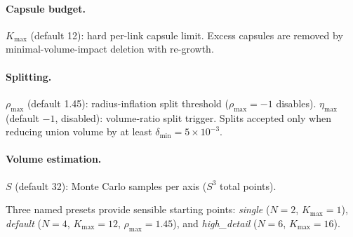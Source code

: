 \paragraph{Capsule budget.}
$K_{\max}$ (default 12): hard per-link capsule limit. Excess capsules are removed by minimal-volume-impact deletion with re-growth.

\paragraph{Splitting.}
$\rho_{\max}$ (default 1.45): radius-inflation split threshold ($\rho_{\max} = -1$ disables). $\eta_{\max}$ (default $-1$, disabled): volume-ratio split trigger. Splits accepted only when reducing union volume by at least $\delta_{\min} = 5 \times 10^{-3}$.

\paragraph{Volume estimation.}
$S$ (default 32): Monte Carlo samples per axis ($S^3$ total points).

Three named presets provide sensible starting points: \emph{single} ($N = 2$, $K_{\max} = 1$), \emph{default} ($N = 4$, $K_{\max} = 12$, $\rho_{\max} = 1.45$), and \emph{high\_detail} ($N = 6$, $K_{\max} = 16$).
